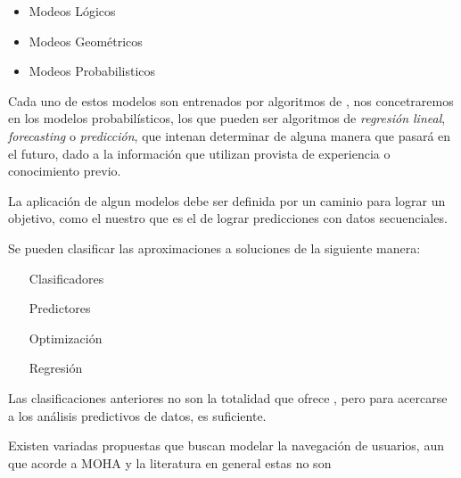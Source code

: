 \begin{itemize}
 \item Modeos Lógicos
 \item Modeos Geométricos
 \item Modeos Probabilisticos
\end{itemize} 


Cada uno de estos modelos son entrenados por algoritmos de \machinelearning, nos concetraremos en los modelos probabilísticos, los que pueden ser algoritmos de \emph{regresión lineal}, \emph{forecasting} o \emph{predicción}, que intenan determinar de alguna manera que pasará en el futuro, dado a la información que utilizan provista de experiencia o conocimiento previo.


La aplicación de algun modelos debe ser definida por un caminio para lograr un objetivo, como el nuestro que es el de lograr predicciones con datos secuenciales.  





Se pueden clasificar las aproximaciones a soluciones de la siguiente manera:

\begin{itemize}
	
	\item[Clasificadores]	
		
	\item[Predictores]		
		
	\item[Optimización]	
		
	\item[Regresión]
		

\end{itemize}

Las clasificaciones anteriores no son la totalidad que ofrece \machinelearning, pero para acercarse a los análisis predictivos de datos, es suficiente.








Existen variadas propuestas que buscan modelar la navegación de usuarios, aun que acorde a MOHA y la literatura en general estas no son \online











